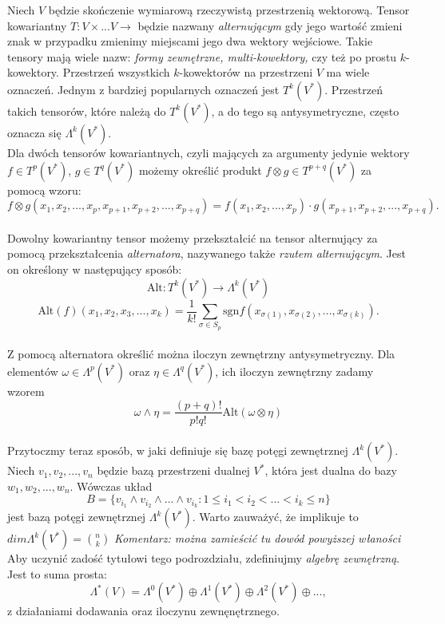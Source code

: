 \documentclass[licencjacka]{pracamgr}
\theoremstyle{definition}
\theoremstyle{definition}
\theoremstyle{plain}
\theoremstyle{plain}
\begin{document}
Niech $V$ będzie skończenie wymiarową rzeczywistą przestrzenią wektorową.
Tensor kowariantny $T:V \times ... V \rightarrow$ będzie nazwany
\emph{alternującym} gdy jego wartość zmieni znak w przypadku zmienimy miejscami
jego dwa wektory wejściowe. Takie tensory mają wiele nazw:
\emph{formy zewnętrzne, multi-kowektory,} czy też po prostu $k$-kowektory.
Przestrzeń wszystkich $k$-kowektorów na przestrzeni $V$ ma wiele oznaczeń. 
Jednym z bardziej popularnych oznaczeń jest $T^k (V^\ast)$.
Przestrzeń takich tensorów, które należą do $T^k (V^\ast)$, a do tego są
antysymetryczne, często oznacza się $\Lambda^k (V^\ast)$. \\

Dla dwóch tensorów kowariantnych, czyli mających za argumenty jedynie wektory
$f \in T^p(V^\ast) $, $g \in T^q(V^\ast) $
możemy określić produkt $f \otimes g \in T^{p+q}(V^\ast) $ za pomocą wzoru:
\[
  f \otimes g(x_1, x_2, ..., x_p, x_{p+1}, x_{p+2}, ... ,x_{p+q}) =
  f(x_1, x_2, ... , x_p) \cdot g(x_{p+1}, x_{p+2}, ... , x_{p+q}).
\] \\

Dowolny kowariantny tensor możemy
przekształcić na tensor alternujący za pomocą przekształcenia
\emph{alternatora}, nazywanego także \emph{rzutem alternującym}.
Jest on określony w następujący sposób:
\[
\text{Alt}:T^k (V^\ast) \rightarrow  \Lambda^k (V^\ast)
\]
\[
\text{Alt}(f)(x_1, x_2, x_3, ..., x_k) = \frac{1}{k!}
  \sum_{\sigma \in S_p}
     \text{sgn} f(x_{\sigma(1)}, x_{\sigma(2)}, ..., x_{\sigma(k)}).
\] \\

Z pomocą alternatora określić można iloczyn zewnętrzny antysymetryczny. 
Dla elementów $\omega \in \Lambda^p (V^\ast)$ oraz 
$\eta \in \Lambda^q (V^\ast)$, ich iloczyn zewnętrzny zadamy wzorem
\[
  \omega \wedge \eta = \frac{(p+q)!}{p!q!} \text{Alt} (\omega \otimes \eta)
\] \\

Przytoczmy teraz sposób, w jaki definiuje się bazę potęgi zewnętrznej
$\Lambda^k(V^\ast)$. Niech $v_1, v_2, ... , v_n$ będzie bazą przestrzeni dualnej
$V^\ast$, która jest dualna do bazy $w_1, w_2, ..., w_n$.
Wówczas układ
\[
  B = \{ v_{i_1} \wedge v_{i_2} \wedge ... \wedge v_{i_k} : 1 \leq i_1 < i_2 < ... <i_k \leq n \}
\]
jest bazą potęgi zewnętrznej $\Lambda^k(V^\ast)$. Warto zauważyć, że implikuje
 to $dim \Lambda^k ( V^\ast)= \binom{n}{k}$
\emph{Komentarz: można zamieścić tu dowód powyższej właności} \\

Aby uczynić zadość tytułowi tego podrozdziału, zdefiniujmy
\emph{algebrę zewnętrzną}. Jest to suma prosta:
\[
\Lambda^\ast (V) = 
\Lambda^0(V^\ast) \oplus
\Lambda^1(V^\ast) \oplus
\Lambda^2(V^\ast) \oplus
..., 
\] z działaniami dodawania oraz iloczynu zewnęnętrznego.
\end{document}
